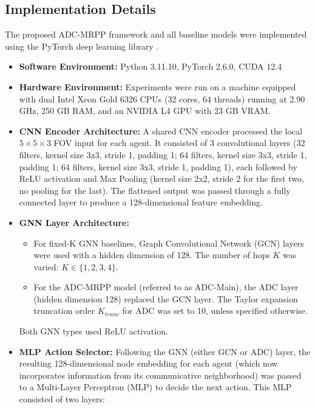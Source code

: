 \subsection{Implementation Details}
\label{subsec:implementation_details}
The proposed ADC-MRPP framework and all baseline models were implemented using the PyTorch deep learning library \cite{Paszke2019PyTorch}.
\begin{itemize}
    \item \textbf{Software Environment:} Python 3.11.10, PyTorch 2.6.0, CUDA 12.4
    \item \textbf{Hardware Environment:} Experiments were run on a machine equipped with dual Intel Xeon Gold 6326 CPUs (32 cores, 64 threads) running at 2.90 GHz, 250 GB RAM, and an NVIDIA L4 GPU with 23 GB VRAM.
    \item \textbf{CNN Encoder Architecture:} A shared CNN encoder processed the local $5 \times 5 \times 3$ FOV input for each agent. It consisted of 3 convolutional layers (32 filters, kernel size 3x3, stride 1, padding 1; 64 filters, kernel size 3x3, stride 1, padding 1; 64 filters, kernel size 3x3, stride 1, padding 1), each followed by ReLU activation and Max Pooling (kernel size 2x2, stride 2 for the first two, no pooling for the last). The flattened output was passed through a fully connected layer to produce a 128-dimensional feature embedding.
    \item \textbf{GNN Layer Architecture:}
        \begin{itemize}
            \item For fixed-K GNN baselines, Graph Convolutional Network (GCN) layers \cite{Kipf2017GCN} were used with a hidden dimension of 128. The number of hops $K$ was varied: $K \in \{1, 2, 3, 4\}$.
            \item For the ADC-MRPP model (referred to as ADC-Main), the ADC layer (hidden dimension 128) replaced the GCN layer. The Taylor expansion truncation order $K_{trunc}$ for ADC was set to 10, unless specified otherwise.
        \end{itemize}
        Both GNN types used ReLU activation.
        \item \textbf{MLP Action Selector:} Following the GNN (either GCN or ADC) layer, the resulting 128-dimensional node embedding for each agent (which now incorporates information from its communicative neighborhood) was passed to a Multi-Layer Perceptron (MLP) to decide the next action. This MLP consisted of two layers:
        \begin{itemize}

\end{itemize}
\end{itemize}
